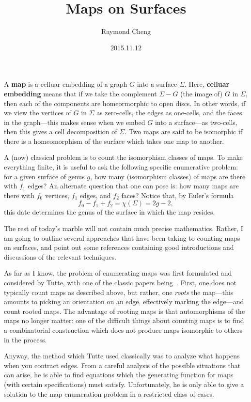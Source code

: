 \documentclass{axolotl}
\title{Maps on Surfaces}
\author{Raymond Cheng}
\date{2015.11.12}
\begin{document}
\maketitle
{} A \textbf{map} is a celluar embedding of a graph \(G\) into a
surface \(\Sigma\). Here, \textbf{celluar embedding} means that if we take the
complement \(\Sigma - G\) (the image of) \(G\) in \(\Sigma\), then each of the
components are homeormorphic to open discs. In other words, if we view the
vertices of \(G\) in \(\Sigma\) as zero-cells, the edges as one-cells, and the
faces in the graph---this makes sense when we embed \(G\) into a surface---as
two-cells, then this gives a cell decomposition of \(\Sigma\). Two maps are
said to be isomorphic if there is a homeomorphism of the surface which takes
one map to another.

A (now) classical problem is to count the isomorphism classes of maps. To make
everything finite, it is useful to ask the following specific enumerative problem:
for a given surface of genus \(g\), how many (isomorphism classes) of maps are
there with \(f_1\) edges? An alternate question that one can pose is: how many
maps are there with \(f_0\) vertices, \(f_1\) edges, and \(f_2\) faces? Notice
that, by Euler's formula
\[ f_0 - f_1 + f_2 = \chi(\Sigma) = 2g - 2, \]
this date determines the genus of the surface in which the map resides.

The rest of today's marble will not contain much precise mathematics. Rather, I
am going to outline several approaches that have been taking to counting maps
on surfaces, and point out some references containing good introductions and
discussions of the relevant techniques.

As far as I know, the problem of enumerating maps was first formulated and
considered by Tutte, with one of the classic papers being~\cite{Tut}. First,
one does not typically count maps as described above, but rather, one
\emph{roots} the map---this amounts to picking an orientation on an edge,
effectively marking the edge---and count rooted maps. The advantage of rooting
maps is that automorphisms of the maps no longer matter: one of the difficult
things about counting maps is to find a combinatorial construction which does
not produce maps isomorphic to others in the process.

Anyway, the method which Tutte used classically was to analyze what happens when
you contract edges. From a careful analysis of the possible situations that can
arise, he is able to find equations which the generating function for maps (with
certain specifications) must satisfy. Unfortunately, he is only able to give
a solution to the map enumeration problem in a restricted class of cases.
\end{document}
